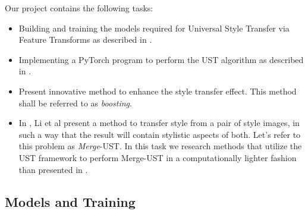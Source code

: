 \hspace{0.5cm} Our project contains the following tasks: 
\begin{itemize}
	\item Building and training the models required for Universal Style Transfer via Feature Transforms as described in \cite{bib11}.
	\item Implementing a PyTorch program to perform the UST algorithm as described in \cite{bib11}.
	\item Present innovative method to enhance the style transfer effect. This method shall be referred to as \textit{boosting}.
	\item In \cite{bib11}, Li et al present a method to transfer style from a pair of style images, in such a way that the result will contain stylistic aspects of both. Let's refer to this problem as \textit{Merge}-UST. In this task we research methods that utilize the UST framework to perform Merge-UST in a computationally lighter fashion than presented in \cite{bib11}.
\end{itemize}


\subsection{Models and Training}
\label{models_methods_lbl}


